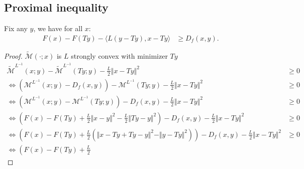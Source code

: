 \documentclass[12pt]{article}
\begin{document}
    \subsection{Proximal inequality}
    \begin{theorem}\label{thm:prox-grad-ineq}
        Fix any $y$, we have for all $x$: 
        \begin{align*}
            F(x) - F(Ty) - \langle L(y - Ty), x - Ty\rangle
            &\ge  D_f(x, y). 
        \end{align*}
    \end{theorem}
    \begin{proof}
        $\widetilde {\mathcal M}(\cdot; x)$ is $L$ strongly convex with minimizer $Ty$
        {\small
        \begin{align*}
            \widetilde{\mathcal M}^{L^{-1}}(x; y) - 
            \widetilde{\mathcal M}^{L^{-1}}(Ty; y)
            - 
            \frac{L}{2}\Vert x - Ty\Vert^2
            &\ge 
            0
            \\
            \iff
            \left(
                \mathcal M^{L^{-1}}(x; y) - D_f(x, y)
            \right) - 
            \mathcal M^{L^{-1}}(Ty; y) 
            - 
            \frac{L}{2}\Vert x - Ty\Vert^2
            &\ge 0
            \\
            \iff 
            \left(
                \mathcal M^{L^{-1}}(x; y)
                - 
                \mathcal M^{L^{-1}}(Ty; y)
            \right)
            - 
            D_f(x, y) 
            - \frac{L}{2}\Vert x - Ty\Vert^2
            &\ge 0
            \\
            \iff 
            \left(
                F(x) - F(Ty) 
                + 
                \frac{L}{2}\Vert x - y\Vert^2 - 
                \frac{L}{2}\Vert Ty - y\Vert^2
            \right)
            - 
            D_f(x, y) 
            - \frac{L}{2}\Vert x - Ty\Vert^2
            &\ge 0
            \\
            \iff 
            \left(
                F(x) - F(Ty) 
                + 
                \frac{L}{2}
                \left(
                    \Vert x - Ty + Ty - y\Vert^2
                    - 
                    \Vert y - Ty\Vert^2
                \right)
            \right)
            - 
            D_f(x, y) 
            - \frac{L}{2}\Vert x - Ty\Vert^2
            &\ge 0
            \\
            \iff 
            \left(
                F(x) - F(Ty) 
                + 
                \frac{L}{2}

\end{align*}}
\end{proof}
\end{document}
